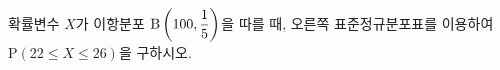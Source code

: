 \noindent\begin{minipage}[t]{0.58\linewidth}\vspace{0pt}\raggedright 확률변수 $X$가 이항분포 $\mathrm{B}\left(100{,}\mkern3mu\mathopen{}\dfrac{1}{5}\right)$을 따를 때, 오른쪽 표준정규분포표를 이용하여 $\mathrm{P}(22\le X\le 26)$을 구하시오.\end{minipage}\hfill\begin{minipage}[t]{0.4\linewidth}\vspace{0pt}\centering \resizebox{\ifdim\width>\linewidth\linewidth\else\width\fi}{!}{}\end{minipage}\par
